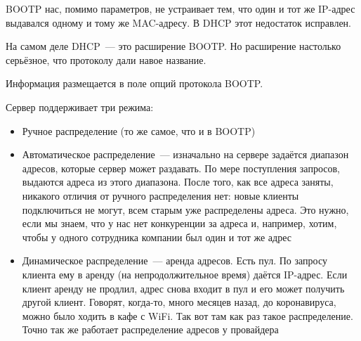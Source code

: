 BOOTP нас, помимо параметров, не устраивает тем, что один и тот же IP-адрес выдавался одному и тому же MAC-адресу. В DHCP этот недостаток исправлен. 

На самом деле DHCP~--- это расширение BOOTP. Но расширение настолько серьёзное, что протоколу дали навое название.

Информация размещается в поле опций протокола BOOTP.

Сервер поддерживает три режима:
\begin{itemize}
    \item Ручное распределение (то же самое, что и в BOOTP)
    \item Автоматическое распределение~--- изначально на сервере задаётся диапазон адресов, которые сервер может раздавать. По мере поступления запросов, выдаются адреса из этого диапазона. После того, как все адреса заняты, никакого отличия от ручного распределения нет: новые клиенты подключиться не могут, всем старым уже распределены адреса. Это нужно, если мы знаем, что у нас нет конкуренции за адреса и, например, хотим, чтобы у одного сотрудника компании был один и тот же адрес
    \item Динамическое распределение~--- аренда адресов. Есть пул. По запросу клиента ему в аренду (на непродолжительное время) даётся IP-адрес. Если клиент аренду не продлил, адрес снова входит в пул и его может получить другой клиент. Говорят, когда-то, много месяцев назад, до коронавируса, можно было ходить в кафе с WiFi. Так вот там как раз такое распределение. Точно так же работает распределение адресов у провайдера
\end{itemize}

